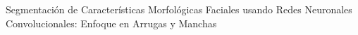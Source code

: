 \begin{center}
	\vspace*{10cm}
	{Segmentación de Características Morfológicas Faciales usando Redes Neuronales Convolucionales: Enfoque en Arrugas y Manchas}
\end{center}
